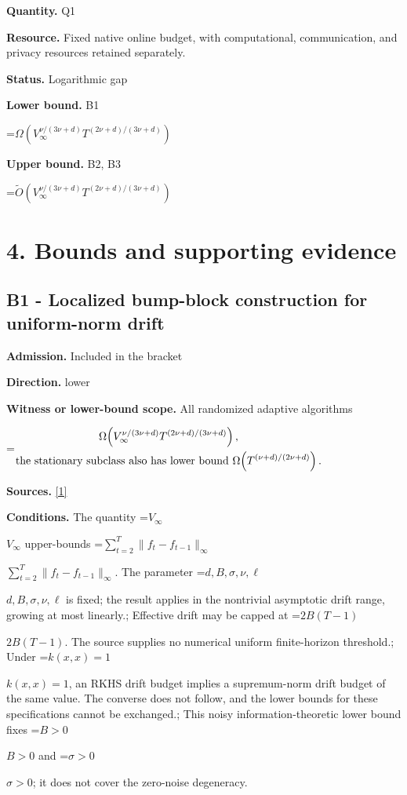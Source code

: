 \documentclass[10pt,a4paper]{article}
\newcommand{\AtlasMath}[1]{\par\begingroup\centering\setbox0=\hbox{$\displaystyle #1$}\ifdim\wd0>1.4\linewidth\typeout{ATLAS WIDE FORMULA: \the\wd0}\fi\ifdim\wd0>\linewidth\resizebox{\linewidth}{!}{\box0}\else\box0\fi\par\endgroup}
\newcommand{\AtlasInlineMath}[1]{\begingroup\setbox0=\hbox{$#1$}\ifdim\wd0>.4\linewidth\endgroup\AtlasMath{#1}\else\endgroup$#1$\fi}
\begin{document}
\textbf{Quantity.} Q1

\textbf{Resource.} Fixed native online budget, with computational, communication, and privacy resources retained separately.

\textbf{Status.} Logarithmic gap

\textbf{Lower bound.} B1

\AtlasMath{\Omega(V_\infty^{\nu/(3\nu+d)}T^{(2\nu+d)/(3\nu+d)})}
\textbf{Upper bound.} B2, B3

\AtlasMath{\widetilde{O}\!\left(V_\infty^{\nu/(3\nu+d)}T^{(2\nu+d)/(3\nu+d)}\right)}
\section{4. Bounds and supporting evidence}
\subsection{B1 - Localized bump-block construction for uniform-norm drift}
\textbf{Admission.} Included in the bracket

\textbf{Direction.} lower

\textbf{Witness or lower-bound scope.} All randomized adaptive algorithms

\AtlasMath{\begin{gathered}\Omega\!\left(V_\infty^{\nu/(3\nu+d)}T^{(2\nu+d)/(3\nu+d)}\right),\\ \text{\text{the stationary subclass also has lower bound} }\Omega\!\left(T^{(\nu+d)/(2\nu+d)}\right).\end{gathered}}
\textbf{Sources.} \href{https://raw.githubusercontent.com/mlresearch/v258/main/assets/cai25a/cai25a.pdf}{[1]}

\textbf{Conditions.} The quantity \AtlasInlineMath{V_\infty} upper-bounds \AtlasInlineMath{\sum_{t=2}^T\|f_t-f_{t-1}\|_\infty}. The parameter \AtlasInlineMath{d,B,\sigma,\nu,\ell} is fixed; the result applies in the nontrivial asymptotic drift range, growing at most linearly.; Effective drift may be capped at \AtlasInlineMath{2B(T-1)}. The source supplies no numerical uniform finite-horizon threshold.; Under \AtlasInlineMath{k(x,x)=1}, an RKHS drift budget implies a supremum-norm drift budget of the same value. The converse does not follow, and the lower bounds for these specifications cannot be exchanged.; This noisy information-theoretic lower bound fixes \AtlasInlineMath{B>0} and \AtlasInlineMath{\sigma>0}; it does not cover the zero-noise degeneracy.
\end{document}
